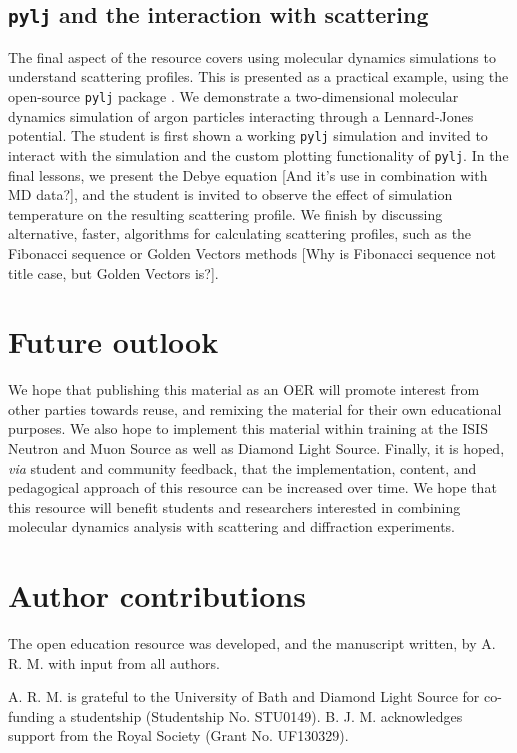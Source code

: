 \documentclass[amsmath,amssymb,twocolumn,superscriptaddress]{revtex4-1}
\begin{document}
\subsection{\texttt{pylj} and the interaction with scattering}

The final aspect of the resource covers using molecular dynamics simulations to understand scattering profiles.
This is presented as a practical example, using the open-source \texttt{pylj} package \cite{mccluskey_pylj_2018}. 
We demonstrate a two-dimensional molecular dynamics simulation of argon particles interacting through a Lennard-Jones potential.
The student is first shown a working \texttt{pylj} simulation and invited to interact with the simulation and the custom plotting functionality of \texttt{pylj}.
In the final lessons, we present the Debye equation \cite{debye_zerstreuung_1915} [And it's use in combination with MD data?], and the student is invited to observe the effect of simulation temperature on the resulting scattering profile.
We finish by discussing alternative, faster, algorithms for calculating scattering profiles, such as the Fibonacci sequence or Golden Vectors methods \cite{svergun_solution_1994,watson_rapid_2013} [Why is Fibonacci sequence not title case, but Golden Vectors is?].

\section{Future outlook}

We hope that publishing this material as an OER will promote interest from other parties towards reuse, and remixing the material for their own educational purposes.
We also hope to implement this material within training at the ISIS Neutron and Muon Source as well as Diamond Light Source.
Finally, it is hoped, \textit{via} student and community feedback, that the implementation, content, and pedagogical approach of this resource can be increased over time. We hope that this resource will benefit students and researchers interested in combining molecular dynamics analysis with scattering and diffraction experiments.

\section{Author contributions}

The open education resource was developed, and the manuscript written, by A. R. M. with input from all authors.

\begin{acknowledgements}
A. R. M. is grateful to the University of Bath and Diamond Light Source for co-funding a studentship (Studentship No. STU0149).
B. J. M. acknowledges support from the Royal Society (Grant No. UF130329).
\end{acknowledgements}


\end{document}
